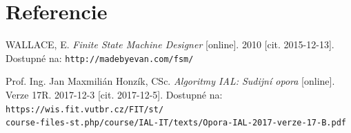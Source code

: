 \documentclass[a4paper, 12pt]{article}
\begin{document}
\section{Referencie} \label{reference}

\begin{thebibliography}{2}

WALLACE, E.
\textit{Finite State Machine Designer}
[online]. 2010 [cit. 2015-12-13]. Dostupné na: \texttt{http://madebyevan.com/fsm/}

Prof. Ing. Jan Maxmilián Honzík, CSc.
\textit{Algoritmy IAL: Sudijní opora}
[online]. Verze 17R. 2017-12-3 [cit. 2017-12-5].
Dostupné na: \texttt{https://wis.fit.vutbr.cz/FIT/st/\\course-files-st.php/course/IAL-IT/texts/Opora-IAL-2017-verze-17-B.pdf}

\end{thebibliography}
\end{document}
